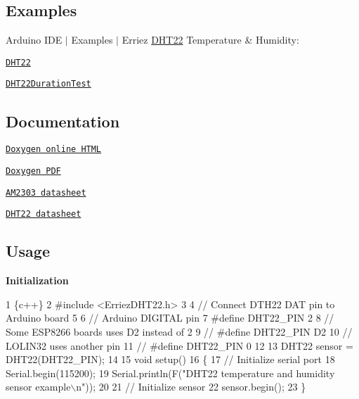 \subsection*{Examples}

Arduino I\+DE $\vert$ Examples $\vert$ Erriez \hyperlink{class_d_h_t22}{D\+H\+T22} Temperature \& Humidity\+:


\begin{DoxyItemize}
\item \href{https://github.com/Erriez/ErriezDHT22/blob/master/examples/DHT22/DHT22.ino}{\tt D\+H\+T22}
\item \href{https://github.com/Erriez/ErriezDHT22/blob/master/examples/DHT22DurationTest/DHT22DurationTest.ino}{\tt D\+H\+T22\+Duration\+Test}
\end{DoxyItemize}

\subsection*{Documentation}


\begin{DoxyItemize}
\item \href{https://erriez.github.io/ErriezDHT22}{\tt Doxygen online H\+T\+ML}
\item \href{https://github.com/Erriez/ErriezDHT22/raw/gh-pages/latex/ErriezDHT22.pdf}{\tt Doxygen P\+DF}
\item \href{https://raw.githubusercontent.com/Erriez/ErriezDHT22/master/extras/AM2303_datasheet.pdf}{\tt A\+M2303 datasheet}
\item \href{https://www.google.com/search?q=DHT22+datasheet}{\tt D\+H\+T22 datasheet}
\end{DoxyItemize}

\subsection*{Usage}

{\bfseries Initialization}


\begin{DoxyCode}
1 \{c++\}
2 #include <ErriezDHT22.h>
3 
4 // Connect DTH22 DAT pin to Arduino board
5 
6 // Arduino DIGITAL pin
7 #define DHT22\_PIN      2
8 // Some ESP8266 boards uses D2 instead of 2
9 // #define DHT22\_PIN   D2
10 // LOLIN32 uses another pin
11 // #define DHT22\_PIN   0
12 
13 DHT22 sensor = DHT22(DHT22\_PIN);
14 
15 void setup()
16 \{
17     // Initialize serial port
18     Serial.begin(115200);
19     Serial.println(F("DHT22 temperature and humidity sensor example\(\backslash\)n"));
20 
21     // Initialize sensor
22     sensor.begin();
23 \}
\end{DoxyCode}


